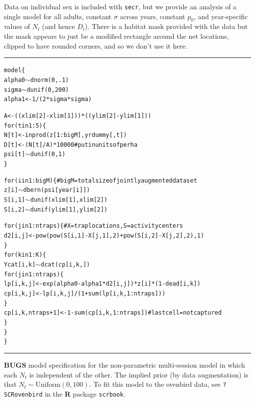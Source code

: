 Data on individual sex is included
with \mbox{\tt secr}, but  we provide an analysis of a single model
for all adults, constant $\sigma$ across years, constant $p_{0}$, and
year-specific values of $N_{t}$ (and hence $D_{t}$).
 There is a habitat mask provided with the data but the mask
appears to just be a modified rectangle around the net locations,
clipped to have rounded corners, and so we don't use it here.






\begin{panel}[htp]
\centering
\rule[0.15in]{\textwidth}{.03in}
{\small
\begin{alltt}
model \{
 alpha0 \(\sim\) dnorm(0,.1)
 sigma \(\sim\) dunif(0,200)
 alpha1 <- 1/(2*sigma*sigma)

 A <- ((xlim[2]-xlim[1]))*((ylim[2]-ylim[1]))
 for(t in 1:5)\{
  N[t] <- inprod(z[1:bigM],yrdummy[,t])
  D[t] <- (N[t]/A)*10000  # put in units of per ha
  psi[t] \(\sim\) dunif(0,1)
 \}

 for(i in 1:bigM)\{  # bigM = total size of jointly augmented data set
   z[i] \(\sim\) dbern(psi[year[i]])
   S[i,1] \(\sim\) dunif(xlim[1],xlim[2])
   S[i,2] \(\sim\) dunif(ylim[1],ylim[2])

 for(j in 1:ntraps)\{  # X = trap locations, S = activity centers
    d2[i,j] <- pow(pow(S[i,1]-X[j,1],2) + pow(S[i,2]-X[j,2],2),1)
  \}
 for(k in 1:K)\{
   Ycat[i,k] \(\sim\) dcat(cp[i,k,])
   for(j in 1:ntraps)\{
     lp[i,k,j] <- exp(alpha0 - alpha1*d2[i,j])*z[i]*(1-dead[i,k])
     cp[i,k,j] <- lp[i,k,j]/(1+sum(lp[i,k,1:ntraps]))
   \}
   cp[i,k,ntraps+1] <- 1-sum(cp[i,k,1:ntraps])  # last cell = not captured
  \} 
 \}  
\}
\end{alltt}
}
\rule[-0.15in]{\textwidth}{.03in}
\caption{
{\bf BUGS} model specification for the non-parametric multi-session
model in which each $N_{t}$ is independent of the other. The implied
prior (by data augmentation) is that $N_{t} \sim
\mbox{Uniform}(0,100)$.
To fit this model to the ovenbird data, see
 \mbox{\tt ?SCRovenbird} in the {\bf R} package \mbox{\tt scrbook}.
}
\label{poisson-mn.panel.ovenbird}
\end{panel}


